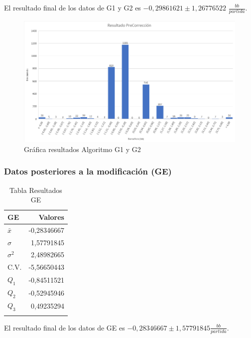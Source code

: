 \vspace{5mm} %

El resultado final de los datos de G1 y G2 es $-0,29861621\pm1,26776522$ $\frac{bb}{partida}$.

\vspace{5mm} %

\begin{figure}[h]
\centering
\includegraphics[width=1\textwidth]{figuras/AGP.png}   
\caption{Gráfica resultados Algoritmo G1 y G2}
\label{fig:AGP}
\end{figure}

\newpage

\subsubsection{Datos posteriores a la modificación (GE)}

\begin{longtable}[c]{lr}
\hline
GE & Valores \\ \hline
$\bar{x}$ & -0,28346667 \\ 
$\sigma$ & 1,57791845 \\ 
$\sigma^2$ & 2,48982665 \\ 
C.V. & -5,56650443 \\ 
$Q_1$ & -0,84511521 \\ 
$Q_2$ & -0,52945946 \\ 
$Q_3$ & 0,49235294 \\ \hline
\caption{Tabla Resultados GE}
\label{tab:AGC}
\end{longtable}

\vspace{5mm} %

El resultado final de los datos de GE es $ -0,28346667\pm1,57791845$$\frac{bb}{partida}$.

